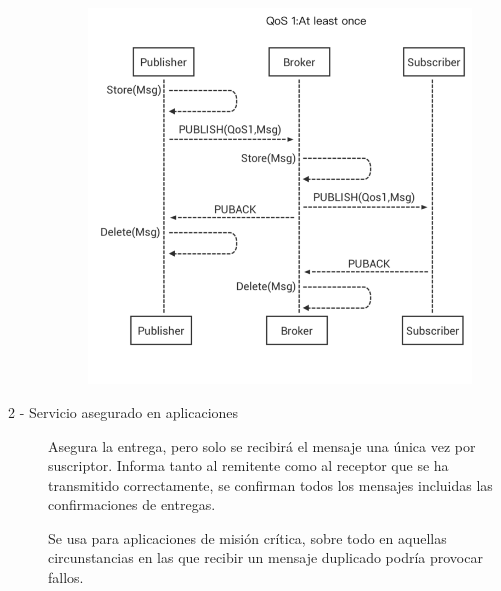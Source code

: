 \documentclass[12pt, twoside, openright]{report} %
\begin{document}
\begin{description}
	      \begin{figure}[H]
		      {\includegraphics[scale=.35]{0_b4pvXUWp6MVnAAFy.png}}
	      \end{figure}
	\item[2 - Servicio asegurado en aplicaciones] Asegura la entrega, pero solo se recibirá el mensaje una única vez por suscriptor. Informa tanto al remitente como al receptor que se ha transmitido correctamente, se confirman todos los mensajes incluidas las confirmaciones de entregas.

	      Se usa para aplicaciones de misión crítica, sobre todo en aquellas circunstancias en las que recibir un mensaje duplicado podría provocar fallos.


\end{description}
\end{document}
